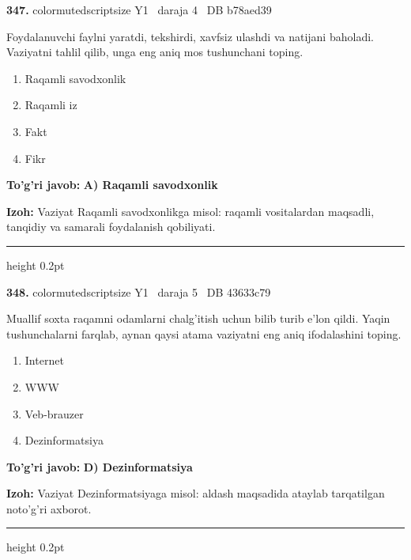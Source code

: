 \documentclass[10pt,a4paper,oneside]{article}
\begin{document}
\noindent\textbf{\color{ink}347.}  {color{muted}scriptsize Y1 \textbullet\ daraja 4 \textbullet\ DB b78aed39}
\par
Foydalanuvchi faylni yaratdi, tekshirdi, xavfsiz ulashdi va natijani baholadi. Vaziyatni tahlil qilib, unga eng aniq mos tushunchani toping.
\begin{enumerate}[label=\Alph*),leftmargin=9mm]
\item Raqamli savodxonlik
\item Raqamli iz
\item Fakt
\item Fikr
\end{enumerate}
\begin{tcolorbox}[enhanced,breakable,colback=teal!4,colframe=teal!50!black,boxrule=0.5pt,arc=1.1mm,left=3mm,right=3mm,top=1.7mm,bottom=1.7mm,before skip=2mm,after skip=2mm]
\textbf{\color{teal}To'g'ri javob:} \textbf{A) Raqamli savodxonlik}
\par\smallskip
\textbf{Izoh:} Vaziyat Raqamli savodxonlikga misol: raqamli vositalardan maqsadli, tanqidiy va samarali foydalanish qobiliyati.
\end{tcolorbox}
\vspace{2mm}\hrule height 0.2pt \vspace{3mm}

\noindent\textbf{\color{ink}348.}  {color{muted}scriptsize Y1 \textbullet\ daraja 5 \textbullet\ DB 43633c79}
\par
Muallif soxta raqamni odamlarni chalg'itish uchun bilib turib e'lon qildi. Yaqin tushunchalarni farqlab, aynan qaysi atama vaziyatni eng aniq ifodalashini toping.
\begin{enumerate}[label=\Alph*),leftmargin=9mm]
\item Internet
\item WWW
\item Veb-brauzer
\item Dezinformatsiya
\end{enumerate}
\begin{tcolorbox}[enhanced,breakable,colback=teal!4,colframe=teal!50!black,boxrule=0.5pt,arc=1.1mm,left=3mm,right=3mm,top=1.7mm,bottom=1.7mm,before skip=2mm,after skip=2mm]
\textbf{\color{teal}To'g'ri javob:} \textbf{D) Dezinformatsiya}
\par\smallskip
\textbf{Izoh:} Vaziyat Dezinformatsiyaga misol: aldash maqsadida ataylab tarqatilgan noto'g'ri axborot.
\end{tcolorbox}
\vspace{2mm}\hrule height 0.2pt \vspace{3mm}
\end{document}
